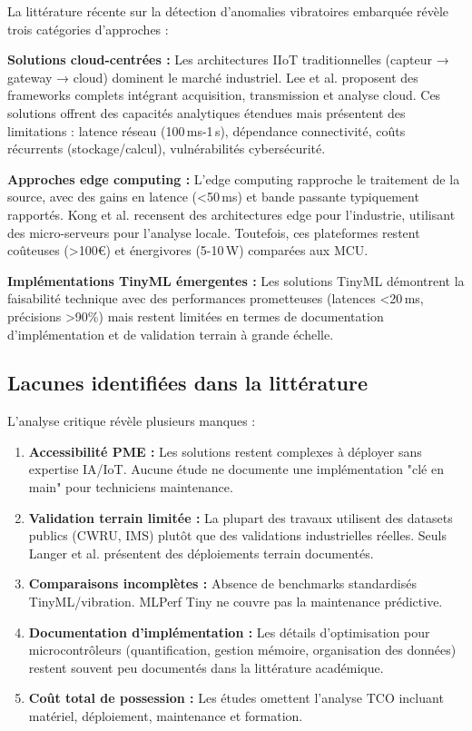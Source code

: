 La littérature récente sur la détection d'anomalies vibratoires embarquée révèle trois catégories d'approches :

\textbf{Solutions cloud-centrées :} Les architectures IIoT traditionnelles (capteur → gateway → cloud) dominent le marché industriel. Lee et al. \cite{lee2014} proposent des frameworks complets intégrant acquisition, transmission et analyse cloud. Ces solutions offrent des capacités analytiques étendues mais présentent des limitations : latence réseau (100\,ms-1\,s), dépendance connectivité, coûts récurrents (stockage/calcul), vulnérabilités cybersécurité.

\textbf{Approches edge computing :} L'edge computing rapproche le traitement de la source, avec des gains en latence (<50\,ms) et bande passante typiquement rapportés. Kong et al. \cite{kong2022} recensent des architectures edge pour l'industrie, utilisant des micro-serveurs pour l'analyse locale. Toutefois, ces plateformes restent coûteuses (>100€) et énergivores (5-10\,W) comparées aux MCU.

\textbf{Implémentations TinyML émergentes :} Les solutions TinyML démontrent la faisabilité technique avec des performances prometteuses (latences <20\,ms, précisions >90\%) mais restent limitées en termes de documentation d'implémentation et de validation terrain à grande échelle.

\subsection{Lacunes identifiées dans la littérature}

L'analyse critique révèle plusieurs manques :

\begin{enumerate}
\item \textbf{Accessibilité PME :} Les solutions restent complexes à déployer sans expertise IA/IoT. Aucune étude ne documente une implémentation "clé en main" pour techniciens maintenance.

\item \textbf{Validation terrain limitée :} La plupart des travaux utilisent des datasets publics (CWRU, IMS) plutôt que des validations industrielles réelles. Seuls Langer et al. \cite{langer2025} présentent des déploiements terrain documentés.

\item \textbf{Comparaisons incomplètes :} Absence de benchmarks standardisés TinyML/vibration. MLPerf Tiny \cite{banbury2021} ne couvre pas la maintenance prédictive.

\item \textbf{Documentation d'implémentation :} Les détails d'optimisation pour microcontrôleurs (quantification, gestion mémoire, organisation des données) restent souvent peu documentés dans la littérature académique.

\item \textbf{Coût total de possession :} Les études omettent l'analyse TCO incluant matériel, déploiement, maintenance et formation.
\end{enumerate}

